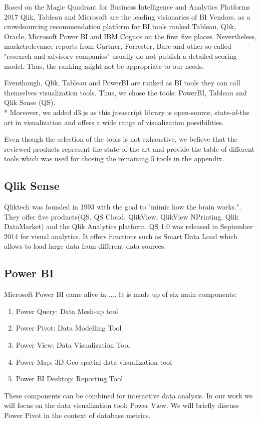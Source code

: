 Based on the Magic Quadrant for Business Intelligence and Analytics Platforms 2017 \cite{Sallam2017} Qlik, Tableau and Microsoft are the leading visionaries of BI Vendors. \cite{ITCentralStation} as a crowdsourcing recommendation platform for BI tools ranked Tableau, Qlik, Oracle, Microsoft Power BI and IBM Cognos on the first five places. Nevertheless, marketrelevance reports from Gartner, Forrester, Barc and other so called "research and advisory companies" usually do not publish a detailed scoring model. Thus, the ranking might not be appropriate to our needs.

Eventhough, Qlik, Tableau and PowerBI are ranked as BI tools they can call themselves visualization tools. 
Thus, we chose the tools: PowerBI, Tableau and Qlik Sense (QS).\\*
Moreover, we added d3.js as this javascript library is open-source, state-of-the art in visualization and offers a wide range of visualization possibilities.

Even though the selection of the tools is not exhaustive, we believe that the reviewed products represent the state-of-the art and provide the table of different tools which was used for chosing the remaining 5 tools in the appendix.

\subsection*{Qlik Sense}
Qliktech was founded in 1993 with the goal to "mimic how the brain works."\cite{qlikHistory}. They offer five products(QS, QS Cloud, QlikView, QlikView NPrinting, Qlik DataMarket) and the Qlik Analytics platform. QS 1.0 was released in September 2014 for visual analytics. 
It offers functions such as Smart Data Load which allows to load large data from different data sources.

\subsection*{Power BI}
Microsoft Power BI came alive in .... It is made up of six main components: 
\begin{enumerate}
    \item Power Query: Data Mesh-up tool
    \item Power Pivot: Data Modelling Tool
    \item Power View: Data Visualization Tool
    \item Power Map: 3D Geo-spatial data visualization tool
    \item Power BI Desktop: Reporting Tool 
\end{enumerate}
These components can be combined for interactive data analysis. In our work we will focus on the data visualization tool: Power View. We will briefly discuss Power Pivot in the context of database metrics. 

